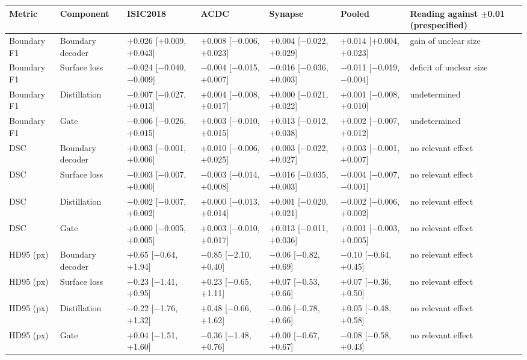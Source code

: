 \begin{tabular}{lllllll}
\toprule
Metric & Component & ISIC2018 & ACDC & Synapse & Pooled & Reading against $\pm$0.01 (prespecified) \\
\midrule
Boundary F1 & Boundary decoder & +0.026 [+0.009, +0.043] & +0.008 [$-$0.006, +0.023] & +0.004 [$-$0.022, +0.029] & +0.014 [+0.004, +0.023] & gain of unclear size \\
Boundary F1 & Surface loss & $-$0.024 [$-$0.040, $-$0.009] & $-$0.004 [$-$0.015, +0.007] & $-$0.016 [$-$0.036, +0.003] & $-$0.011 [$-$0.019, $-$0.004] & deficit of unclear size \\
Boundary F1 & Distillation & $-$0.007 [$-$0.027, +0.013] & +0.004 [$-$0.008, +0.017] & +0.000 [$-$0.021, +0.022] & +0.001 [$-$0.008, +0.010] & undetermined \\
Boundary F1 & Gate & $-$0.006 [$-$0.026, +0.015] & +0.003 [$-$0.010, +0.015] & +0.013 [$-$0.012, +0.038] & +0.002 [$-$0.007, +0.012] & undetermined \\
\midrule
DSC & Boundary decoder & +0.003 [$-$0.001, +0.006] & +0.010 [$-$0.006, +0.025] & +0.003 [$-$0.022, +0.027] & +0.003 [$-$0.001, +0.007] & no relevant effect \\
DSC & Surface loss & $-$0.003 [$-$0.007, +0.000] & $-$0.003 [$-$0.014, +0.008] & $-$0.016 [$-$0.035, +0.003] & $-$0.004 [$-$0.007, $-$0.001] & no relevant effect \\
DSC & Distillation & $-$0.002 [$-$0.007, +0.002] & +0.000 [$-$0.013, +0.014] & +0.001 [$-$0.020, +0.021] & $-$0.002 [$-$0.006, +0.002] & no relevant effect \\
DSC & Gate & +0.000 [$-$0.005, +0.005] & +0.003 [$-$0.010, +0.017] & +0.013 [$-$0.011, +0.036] & +0.001 [$-$0.003, +0.005] & no relevant effect \\
\midrule
HD95 (px) & Boundary decoder & +0.65 [$-$0.64, +1.94] & $-$0.85 [$-$2.10, +0.40] & $-$0.06 [$-$0.82, +0.69] & $-$0.10 [$-$0.64, +0.45] & no relevant effect \\
HD95 (px) & Surface loss & $-$0.23 [$-$1.41, +0.95] & +0.23 [$-$0.65, +1.11] & +0.07 [$-$0.53, +0.66] & +0.07 [$-$0.36, +0.50] & no relevant effect \\
HD95 (px) & Distillation & $-$0.22 [$-$1.76, +1.32] & +0.48 [$-$0.66, +1.62] & $-$0.06 [$-$0.78, +0.66] & +0.05 [$-$0.48, +0.58] & no relevant effect \\
HD95 (px) & Gate & +0.04 [$-$1.51, +1.60] & $-$0.36 [$-$1.48, +0.76] & +0.00 [$-$0.67, +0.67] & $-$0.08 [$-$0.58, +0.43] & no relevant effect \\
\bottomrule
\end{tabular}
